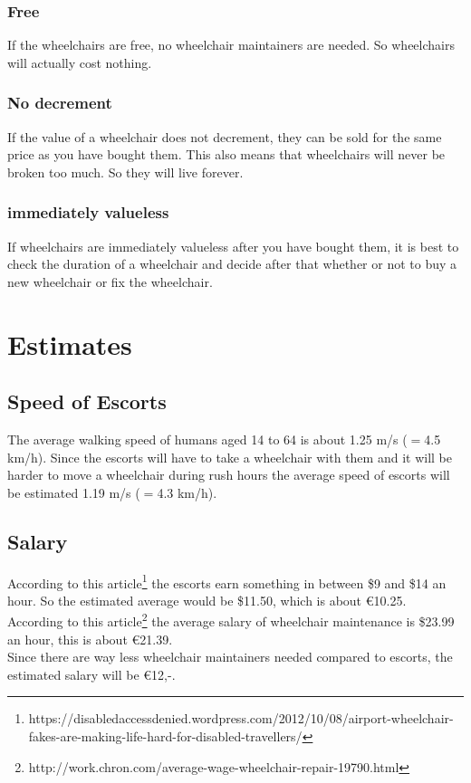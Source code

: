 \documentclass[a4paper, 11pt, notitlepage]{report}
\begin{document}
\subsection{Free}
If the wheelchairs are free, no wheelchair maintainers are needed. So wheelchairs will actually cost nothing.
\subsection{No decrement}
If the value of a wheelchair does not decrement, they can be sold for the same price as you have bought them. This also means that wheelchairs will never be broken too much. So they will live forever.
\subsection{immediately valueless}
If wheelchairs are immediately valueless after you have bought them, it is best to check the duration of a wheelchair and decide after that whether or not to buy a new wheelchair or fix the wheelchair.
\chapter{Estimates}
    \section{Speed of Escorts}
    The average walking speed of humans aged 14 to 64 is about 1.25 m/s  ($=$4.5 km/h). Since the escorts will have to take a wheelchair with them and it will be harder to move a wheelchair during rush hours the average speed of escorts will be estimated 1.19 m/s ($=$4.3 km/h).
    \section{Salary}
    According to this article\footnote{https://disabledaccessdenied.wordpress.com/2012/10/08/airport-wheelchair-fakes-are-making-life-hard-for-disabled-travellers/} the escorts earn something in between \$9 and \$14 an hour. So the estimated average would be \$11.50, which is about \euro{10.25}.\\
    According to this article\footnote{http://work.chron.com/average-wage-wheelchair-repair-19790.html} the average salary of wheelchair maintenance is \$23.99 an hour, this is about \euro{21.39}.\\
    Since there are way less wheelchair maintainers needed compared to escorts, the estimated salary will be \euro{12,-}.
\end{document}
